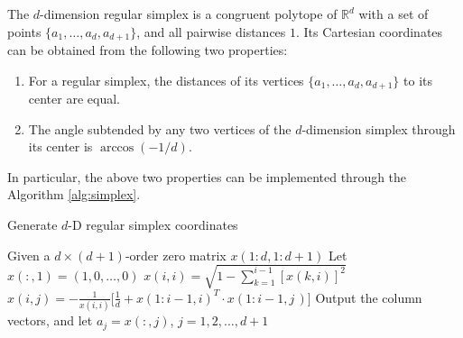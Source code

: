 \documentclass[mathpazo]{csam}
\theoremstyle{remark}
\begin{document}
The $d$-dimension regular simplex is a congruent polytope of
$\mathbb{R}^d$ with a set of points $\{a_1,\dots,a_d,a_{d+1}\}$,
and all pairwise distances $1$.
Its Cartesian coordinates can be obtained from the following two properties:
\begin{enumerate}
	\item For a regular simplex, the distances of its vertices 
		$\{a_1,\dots,a_d,a_{d+1}\}$ to its center are equal.
	\item The angle subtended by any two vertices of the 
		$d$-dimension simplex through its center is
		$\arccos(-1/d)$.
\end{enumerate}
In particular, the above two properties can be implemented
through the Algorithm \ref{alg:simplex}.
\begin{algorithm}[!htpb]
	\caption{Generate $d$-D regular simplex coordinates} 
	\label{alg:simplex}
\begin{algorithmic}
	\STATE Given a $d\times(d+1)$-order zero matrix $x(1:d,1:d+1)$
	\STATE Let $x(:,1) = (1,0,\dots,0)$
	\STATE $x(i,i)=\sqrt{1-\sum_{k=1}^{i-1} [x(k, i)]^{2}}$
		\STATE $x(i,j)
		=-\frac{1}{x(i,i)}\Big[\frac{1}{d}+x(1:i-1, i)^T \cdot
		x(1:i-1, j\,)\Big]$
		\ENDFOR
	\ENDFOR
	\STATE Output the column vectors, and let $a_j=x(:,j)$,
	$j=1,2,\dots,d+1$ 
\end{algorithmic}
\end{algorithm}
\end{document}
